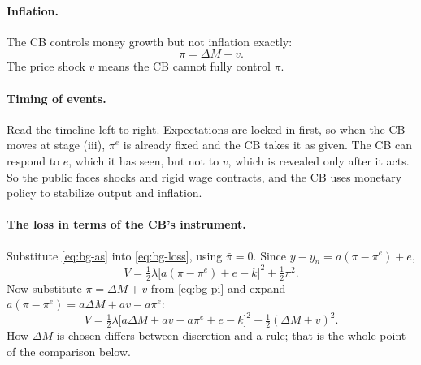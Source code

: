 \paragraph{Inflation.} The CB controls money growth but not inflation exactly:
\begin{equation}
\pi=\Delta M+v .\label{eq:bg-pi}
\end{equation}
The price shock $v$ means the CB cannot fully control $\pi$.

\paragraph{Timing of events.}
\begin{center}
\end{center}
Read the timeline left to right. Expectations are locked in first, so when the CB moves at stage (iii), $\pi^e$ is already fixed and the CB takes it as given. The CB can respond to $e$, which it has seen, but not to $v$, which is revealed only after it acts. So the public faces shocks and rigid wage contracts, and the CB uses monetary policy to stabilize output and inflation.

\paragraph{The loss in terms of the CB's instrument.} Substitute \eqref{eq:bg-as} into \eqref{eq:bg-loss}, using $\bar\pi=0$. Since $y-y_n=a(\pi-\pi^e)+e$,
\begin{equation}
V=\tfrac12\lambda\big[a(\pi-\pi^e)+e-k\big]^2+\tfrac12\pi^2 .\label{eq:bg-loss-pi}
\end{equation}
Now substitute $\pi=\Delta M+v$ from \eqref{eq:bg-pi} and expand $a(\pi-\pi^e)=a\Delta M+av-a\pi^e$:
\begin{equation}
V=\tfrac12\lambda\big[a\Delta M+av-a\pi^e+e-k\big]^2+\tfrac12(\Delta M+v)^2 .\label{eq:bg-loss-dm}
\end{equation}
How $\Delta M$ is chosen differs between discretion and a rule; that is the whole point of the comparison below.

